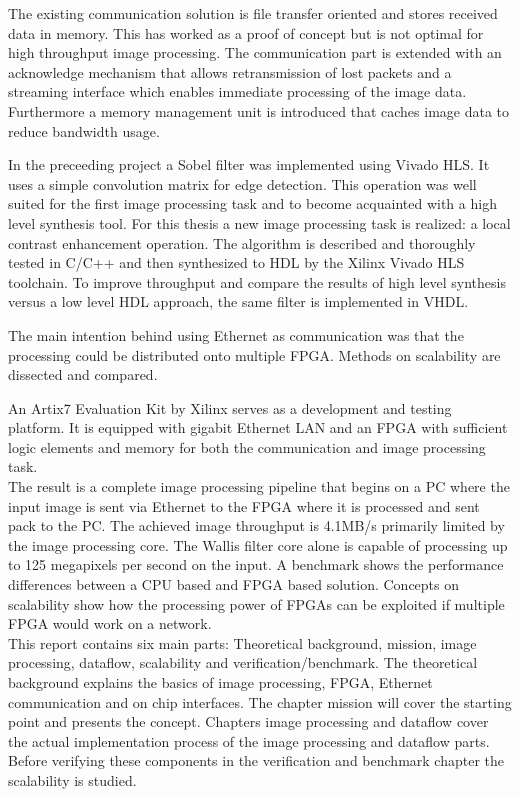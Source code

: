 The existing communication solution is file transfer oriented and stores
received data in memory. This has worked as a proof of concept but is not
optimal
for high throughput image processing. The communication part is extended with an
acknowledge mechanism that allows retransmission of lost packets and a streaming
interface which enables immediate processing of the image data. Furthermore a
memory management unit is introduced that caches image data to reduce bandwidth
usage.

In the preceeding project a Sobel filter was implemented using Vivado HLS. It
uses a simple convolution matrix for edge detection. This operation was well
suited for the first image processing task and to become acquainted with a high
level synthesis tool. For this thesis a new image processing task is realized: a
local contrast enhancement operation. The algorithm is described and thoroughly
tested in C/C++ and then synthesized to HDL by the Xilinx Vivado HLS toolchain.
To improve throughput and compare the results of high level synthesis versus a
low level HDL approach, the same filter is implemented in VHDL.

The main intention behind using Ethernet as communication was that the
processing could be distributed onto multiple FPGA. Methods on scalability are
dissected and compared.

An Artix7 Evaluation Kit by Xilinx serves as a development and testing platform.
It is equipped with gigabit Ethernet LAN and an FPGA with sufficient logic
elements and memory for both the communication and image processing task.
\\

The result is a complete image processing pipeline that begins on a PC where the
input image is sent via Ethernet to the FPGA where it is processed and sent pack
to the PC. The achieved image throughput is 4.1MB/s primarily limited by the image processing core. The Wallis filter core alone
is capable of processing up to 125 megapixels per second on the input. A benchmark shows the performance differences between a CPU based and FPGA based solution. Concepts on
scalability show how the processing power of FPGAs can be exploited if multiple
FPGA would work on a network.
\\

This report contains six main parts: Theoretical background, mission,
image processing, dataflow, scalability and verification/benchmark.  The
theoretical background explains
the basics of image processing, FPGA, Ethernet communication and on chip
interfaces. The chapter mission will
cover the starting point and presents the concept. Chapters 
image processing and dataflow cover the actual
implementation process of the image processing and dataflow parts.
Before verifying these components in the verification and benchmark chapter the
scalability is studied.

